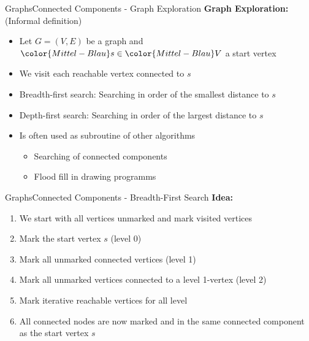 
\begin{frame}{Graphs}{Connected Components - Graph Exploration}
  \textbf{Graph Exploration:} (Informal definition)
  \begin{itemize}
    \item<2->
      Let {\color{Mittel-Blau}$G = (V , E)$} be a graph and
      ${\color{Mittel-Blau}s} \in {\color{Mittel-Blau}V}$ a start vertex
    \item<3->
      We visit each reachable vertex connected to {\color{Mittel-Blau}$s$}
    \item<4->
      {\color{Mittel-Blau}Breadth-first search}: Searching in order of the
      smallest distance to {\color{Mittel-Blau}$s$}
    \item<5->
      {\color{Mittel-Blau}Depth-first search}: Searching in order of the
      largest distance to {\color{Mittel-Blau}$s$}
    \item<6->
      Is often used as subroutine of other algorithms
      \begin{itemize}
        \item<7->
          Searching of connected components
        \item<8->
          Flood fill in drawing programms
      \end{itemize}
  \end{itemize}
\end{frame}


\begin{frame}{Graphs}{Connected Components - Breadth-First Search}
  \textbf{Idea:}
  \begin{enumerate}
    \item<2->
      We start with all vertices unmarked and
      {\color{Mittel-Blau}mark visited vertices}
    \item<3->
      Mark the start vertex {\color{Mittel-Blau}$s$}
      ({\color{Mittel-Blau}level 0})
    \item<4->
      Mark all unmarked {\color{Mittel-Blau}connected vertices}
      ({\color{Mittel-Blau}level 1})
    \item<5->
      Mark all unmarked {\color{Mittel-Blau}vertices connected} to a
      {\color{Mittel-Blau}level 1}-vertex
      ({\color{Mittel-Blau}level 2})
    \item<6->
      Mark iterative reachable vertices for all level
    \item<7->
      All connected nodes are now marked and in the same
      {\color{Mittel-Blau}connected component} as the start vertex
      {\color{Mittel-Blau}$s$}
  \end{enumerate}
\end{frame}

